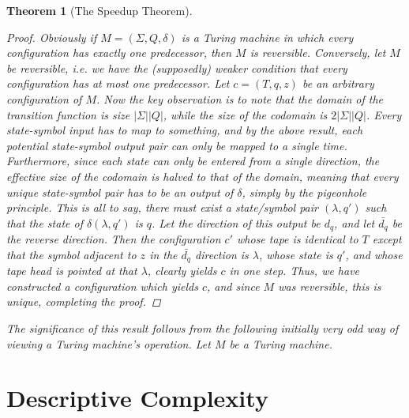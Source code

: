 \documentclass{article}
\theoremstyle{definition}
\theoremstyle{plain}
\theoremstyle{theorem}
\newtheorem{theorem}{Theorem}[section]
\begin{document}
\begin{theorem}[The Speedup Theorem]
\begin{proof}
	Obviously if $M = (\Sigma,Q,\delta)$ is a Turing machine in which every configuration has exactly one predecessor, then $M$ is reversible. Conversely, let $M$ be reversible, i.e. we have the (supposedly) weaker condition that every configuration has \textit{at most} one predecessor. Let $c = (T,q,z)$ be an arbitrary configuration of $M$. Now the key observation is to note that the domain of the transition function is size $|\Sigma||Q|$, while the size of the codomain is $2|\Sigma||Q|$. Every state-symbol input has to map to \textit{something}, and by the above result, each potential state-symbol output pair can only be mapped to a single time. Furthermore, since each state can only be entered from a single direction, the effective size of the codomain is halved to that of the domain, meaning that every unique state-symbol pair \textit{has to} be an output of $\delta$, simply by the pigeonhole principle. This is all to say, there must exist a state/symbol pair $(\lambda,q')$ such that the state of $\delta(\lambda,q')$ is $q$. Let the direction of this output be $d_q$, and let $\bar{d_q}$ be the reverse direction. Then the configuration $c'$ whose tape is identical to $T$ except that the symbol adjacent to $z$ in the $\bar{d_q}$ direction is $\lambda$, whose state is $q'$, and whose tape head is pointed at that $\lambda$, clearly yields $c$ in one step. Thus, we have constructed a configuration which yields $c$, and since $M$ was reversible, this is unique, completing the proof. 
\end{proof}
The significance of this result follows from the following initially very odd way of viewing a Turing machine's operation. Let $M$ be a Turing machine. 	
\section{Descriptive Complexity}

\end{theorem}
\end{document}
